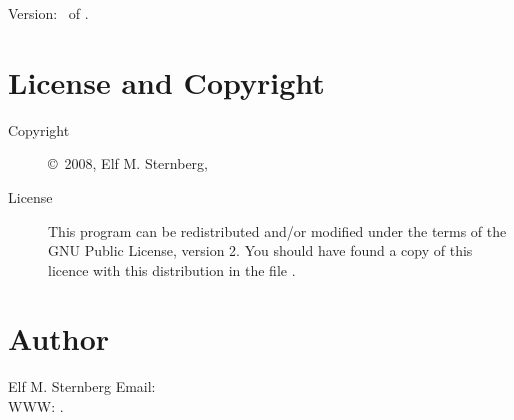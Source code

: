 \documentclass[english]{article}
\begin{document}
Version: \Version\ of \Date.

\section{License and Copyright}

\begin{description}
\item[Copyright] \copyright\ 2008, Elf M. Sternberg,

\item[License] This program can be redistributed and/or modified under
  the terms of the GNU Public License, version 2.  You should have
  found a copy of this licence with this distribution in the file
  .

\end{description}

\section{Author}

\noindent
Elf M. Sternberg
Email:   \\
WWW: .

\LatexManEnd
\end{document}
